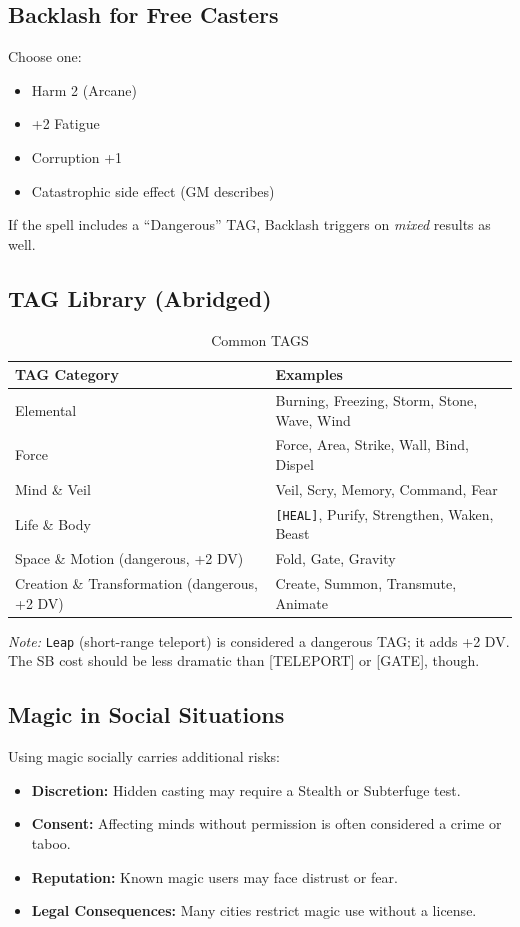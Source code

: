 \subsection{Backlash for Free Casters}
Choose one:
\begin{itemize}
    \item Harm 2 (Arcane)
    \item +2 Fatigue
    \item Corruption +1
    \item Catastrophic side effect (GM describes)
\end{itemize}
If the spell includes a ``Dangerous'' TAG, Backlash triggers on \emph{mixed} results as well.

\subsection{TAG Library (Abridged)}
\label{subsec:tag_library}

\begin{longtable}{p{3.5cm} p{10cm}}
\caption{Common TAGS}\label{tab:tags_abridged}\\
\toprule
\textbf{TAG Category} & \textbf{Examples} \\
\midrule
Elemental & Burning, Freezing, Storm, Stone, Wave, Wind \\
Force & Force, Area, Strike, Wall, Bind, Dispel \\
Mind \& Veil & Veil, Scry, Memory, Command, Fear \\
Life \& Body & \texttt{[HEAL]}, Purify, Strengthen, Waken, Beast \\
Space \& Motion (dangerous, +2 DV) & Fold, Gate, Gravity \\
Creation \& Transformation (dangerous, +2 DV) & Create, Summon, Transmute, Animate \\
\bottomrule
\end{longtable}

\textit{Note:} \texttt{Leap} (short-range teleport) is considered a dangerous TAG; it adds +2 DV. The SB cost should be less dramatic than [TELEPORT] or [GATE], though.

\subsection{Magic in Social Situations}
\label{sec:magic-social}
Using magic socially carries additional risks:
\begin{itemize}
  \item \textbf{Discretion:} Hidden casting may require a Stealth or Subterfuge test.
  \item \textbf{Consent:} Affecting minds without permission is often considered a crime or taboo.
  \item \textbf{Reputation:} Known magic users may face distrust or fear.
  \item \textbf{Legal Consequences:} Many cities restrict magic use without a license.
\end{itemize}

